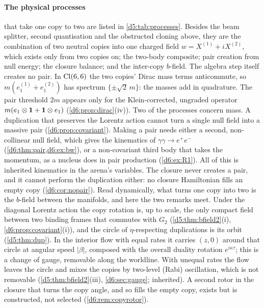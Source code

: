\paragraph{The physical processes} that take one copy to two are listed in \cref{d5:tab:processes}. Besides the beam splitter, second quantisation and the obstructed cloning above, they are the combination of two neutral copies into one charged field $w=X^{(1)}+iX^{(2)}$, which exists only from two copies on; the two-body composite; pair creation from null energy; the closure balance; and the inter-copy $b$-field. The algebra step itself creates no pair. In $\mathrm{Cl}(6,6)$ the two copies' Dirac mass terms anticommute, so $m(e^{(1)}_1+e^{(2)}_1)$ has spectrum $\{\pm\sqrt2\,m\}$: the masses add in quadrature. The pair threshold $2m$ appears only for the Klein-corrected, ungraded operator $m(e_1\otimes\mathbf 1+\mathbf 1\otimes e_1)$ (\cref{d6:prop:dirac}(iv)). Two of the processes concern mass. A duplication that
preserves the Lorentz action cannot turn a single null field into a massive pair (\cref{d6:prop:covariant}). Making a pair needs either a
second, non-collinear null field, which gives the kinematics of $\gamma\gamma\to e^+e^-$ (\cref{d6:thm:pair,d6:ex:bw}), or a non-covariant third
body that takes the momentum, as a nucleus does in pair production (\cref{d6:ex:R1}). All of this is inherited kinematics in the arena's
variables. The closure never creates a pair, and it cannot perform the duplication either: no closure Hamiltonian fills an empty copy (\cref{d6:cor:nopair}). Read dynamically, what turns one copy into two is the $b$-field between the manifolds, and here the two remarks meet. Under the diagonal Lorentz action the copy rotation is, up to scale, the only compact field between two binding frames that commutes with $G_2$ (\cref{d5:thm:bfield2}(i), \cref{d6:prop:covariant}(i)), and the circle of $\eta$-respecting duplications is its orbit (\cref{d5:thm:dup}). In the interior flow with equal rates it carries $(z,0)$ around that circle at angular speed $|\beta|$, composed with the overall duality rotation $e^{i\kappa\tau}$; this is a change of gauge, removable along the worldline. With unequal rates the flow leaves the circle and mixes the copies by two-level (Rabi) oscillation, which is not removable (\cref{d5:thm:bfield2}(iii), \cref{d6:sec:gauge}; inherited). A second rotor in the closure that turns the copy angle, and so fills the empty copy, exists but is constructed, not selected (\cref{d6:rem:copyrotor}).

